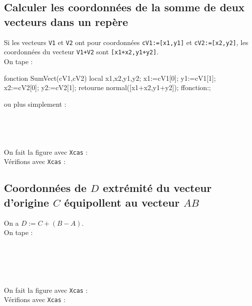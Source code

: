 \documentclass[12pt,a4paper]{book}
\begin{document}
\begin{giacjshere}
\subsection{Calculer les coordonn\'ees de la somme de deux vecteurs dans un rep\`ere}
Si les vecteurs {\tt V1} et {\tt V2} ont pour coordonn\'ees {\tt cV1:=[x1,y1]} 
et {\tt cV2:=[x2,y2]}, les coordonn\'ees du vecteur {\tt V1+V2} sont 
{\tt [x1+x2,y1+y2]}.\\
On tape :
\begin{giacprog}
fonction SumVect(cV1,cV2)
 local x1,x2,y1,y2;
 x1:=cV1[0];
 y1:=cV1[1];
 x2:=cV2[0];
 y2:=cV2[1];
 retourne normal([x1+x2,y1+y2]);
ffonction:;
\end{giacprog}
ou plus simplement :\\
\\
\\
\\
\\
On fait la figure avec {\tt Xcas} :\\
V\'erifions avec {\tt Xcas} :\\
\subsection{Coordonn\'ees de $D$ extr\'emit\'e du vecteur 
d'origine $C$ \'equipollent au vecteur $AB$}
On a $D:=C+(B-A)$.\\
On tape :\\
\\
\\
\\
\\
\\
On fait la figure avec {\tt Xcas} :\\
V\'erifions avec {\tt Xcas} :\\


\end{giacjshere}
\end{document}
